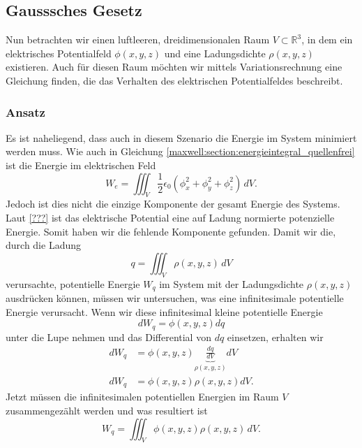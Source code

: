 %
%
%
%
\subsection{Gausssches Gesetz
\label{maxwell:section:elektrostatik_mit_quelle}}
Nun betrachten wir einen luftleeren, dreidimensionalen Raum $V\subset\mathbb{R}^3$, in dem ein elektrisches Potentialfeld $\phi(x,y,z)$ und eine Ladungsdichte $\rho(x,y,z)$ existieren.
Auch für diesen Raum möchten wir mittels Variationsrechnung eine Gleichung finden, die das Verhalten des elektrischen Potentialfeldes beschreibt.

\subsubsection{Ansatz}
Es ist naheliegend, dass auch in diesem Szenario die Energie im System minimiert werden muss.
Wie auch in Gleichung \eqref{maxwell:section:energieintegral_quellenfrei} ist die Energie im elektrischen Feld
\[
W_e
=
\iiint_V \frac{1}{2}\epsilon_0\left(\phi_x^2 + \phi_y^2 + \phi_z^2\right)\, dV.
\]
Jedoch ist dies nicht die einzige Komponente der gesamt Energie des Systems.
Laut \ref{???} ist das elektrische Potential eine auf Ladung normierte potenzielle Energie.
Somit haben wir die fehlende Komponente gefunden.
Damit wir die, durch die Ladung
\begin{equation}
q
=
\iiint_V \rho(x,y,z)\, dV
\label{maxwell:ladung}
\end{equation}
verursachte, potentielle Energie $W_q$ im System mit der Ladungsdichte $\rho(x,y,z)$ ausdrücken können, müssen wir untersuchen, was eine infinitesimale potentielle Energie verursacht.
Wenn wir diese infinitesimal kleine potentielle Energie
\[
dW_q
=
\phi(x,y,z)dq
\]
unter die Lupe nehmen und das Differential von $dq$ einsetzen, erhalten wir
\begin{align*}
dW_q
&=
\phi(x,y,z)\underbrace{\frac{dq}{dV}}_{\rho(x,y,z)}dV
\\
dW_q
&=
\phi(x,y,z)\rho(x,y,z)dV.
\end{align*}
Jetzt müssen die infinitesimalen potentiellen Energien im Raum $V$ zusammengezählt werden und was resultiert ist
\begin{equation}
W_q
=
\iiint_V \phi(x,y,z)\rho(x,y,z)\, dV.
\label{maxwell:section:potenzielle_energie_ladung}
\end{equation}
